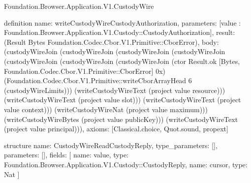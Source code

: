 \begin{lexlean}{Foundation.Browser.Application.V1.CustodyWire}
\begin{semanticmodule}
definition{
  name: writeCustodyWireCustodyAuthorization,
  parameters: [value : Foundation.Browser.Application.V1.Custody::CustodyAuthorization],
  result: (Result Bytes Foundation.Codec.Cbor.V1.Primitive::CborError),
  body: (custodyWireJoin (custodyWireJoin (custodyWireJoin (custodyWireJoin (custodyWireJoin (custodyWireJoin (custodyWireJoin (ctor Result.ok [Bytes, Foundation.Codec.Cbor.V1.Primitive::CborError] 0x) (Foundation.Codec.Cbor.V1.Primitive::writeCborArrayHead 6 (custodyWireLimits))) (writeCustodyWireText (project value resource))) (writeCustodyWireText (project value slot))) (writeCustodyWireText (project value context))) (writeCustodyWireNat (project value maximum))) (writeCustodyWireBytes (project value publicKey))) (writeCustodyWireText (project value principal))),
  axioms: [Classical.choice, Quot.sound, propext]
}

structure{
  name: CustodyWireReadCustodyReply,
  type_parameters: [],
  parameters: [],
  fields: [
    {name: value, type: Foundation.Browser.Application.V1.Custody::CustodyReply},
    {name: cursor, type: Nat}
  ]
}


\end{semanticmodule}
\end{lexlean}
